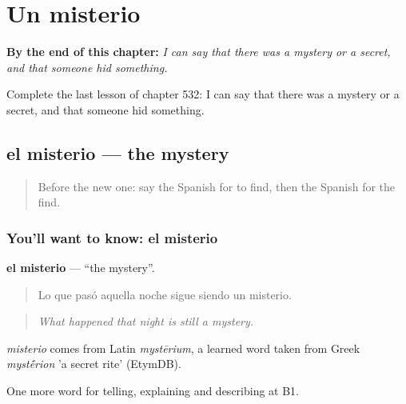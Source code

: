
\chapter{Un misterio}
\label{ch:es-un-misterio}

\begin{chapteropening}
\textbf{By the end of this chapter:} \emph{I can say that there was a mystery or a secret, and that someone hid something.}

Complete the last lesson of chapter 532: I can say that there was a mystery or a secret, and that someone hid something.
\end{chapteropening}

\section[el misterio]{el misterio — the mystery}

\label{lesson:ES-C532-misterio}



\begin{quote}
Before the new one: say the Spanish for to find, then the Spanish for the find.
\end{quote}

\subsection*{You'll want to know: el misterio}
\textbf{el misterio} — \textquotedblleft{}the mystery\textquotedblright{}.

\begin{quote}
Lo que pasó aquella noche sigue siendo un misterio.
\end{quote}

\begin{quote}
\emph{What happened that night is still a mystery.}
\end{quote}

\begin{cousinweb}
\emph{misterio} comes from Latin \emph{mystērium}, a learned word taken from Greek \emph{myst\'{\={e}}rion} 'a secret rite' (EtymDB).
\end{cousinweb}

\begin{grammarlens}[title={What you've built}]
One more word for telling, explaining and describing at B1.
\end{grammarlens}

